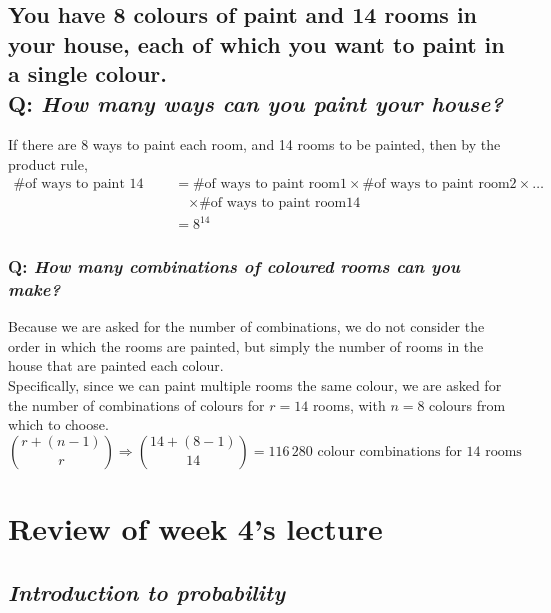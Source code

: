 \documentclass{article}
\begin{document}
\subsection*{{\normalsize You have 8 colours of paint and 14 rooms in your house, each of which you want to paint in a single colour.\\}
Q: {\em How many ways can you paint your house?}}
If there are 8 ways to paint each room, and 14 rooms to be painted, then by the product rule,
\begin{align*}
\text{\# of ways to paint 14 rooms}& =\text{\# of ways to paint room1}\times\text{\# of ways to paint room2}\times\ldots\\
& \quad\times\text{\# of ways to paint room14}\\
& =8^{14}
\end{align*}

\subsubsection*{Q: {\em How many combinations of coloured rooms can you make?}}
Because we are asked for the number of combinations, we do not consider the order in which the rooms are painted, but simply the number of rooms in the house that are painted each colour.\\[1ex]
Specifically, since we can paint multiple rooms the same colour, we are asked for the number of combinations of colours for $r=14$ rooms, with $n=8$ colours from which to choose.
\begin{equation*}
\binom{r+(n-1)}{r}\Rightarrow\binom{14+(8-1)}{14}=116\,280\text{ colour combinations for 14 rooms}
\end{equation*}

\section{\sc Review of week 4's lecture}
\subsection*{\em Introduction to probability}
\end{document}

